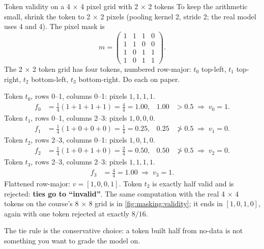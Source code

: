 \begin{worked}[label={we:masking:validity}]{Token validity on a 4 \texorpdfstring{$\times$}{x} 4 pixel grid with 2 \texorpdfstring{$\times$}{x} 2 tokens}
To keep the arithmetic small, shrink the token to 2 $\times$ 2 pixels (pooling kernel 2, stride 2; the
real model uses 4 and 4). The pixel mask is
\[
m = \begin{pmatrix} 1 & 1 & 1 & 0\\ 1 & 1 & 0 & 0\\ 1 & 0 & 1 & 1\\ 1 & 0 & 1 & 1 \end{pmatrix}.
\]
The 2 $\times$ 2 token grid has four tokens, numbered row-major: $t_0$ top-left, $t_1$ top-right,
$t_2$ bottom-left, $t_3$ bottom-right. Do each on paper.

Token $t_0$, rows 0--1, columns 0--1: pixels $1, 1, 1, 1$.
\begin{align*}
f_0 &= \tfrac14 (1 + 1 + 1 + 1) = \tfrac44 = 1.00, & 1.00 &> 0.5 \;\Rightarrow\; v_0 = 1 .
\end{align*}
Token $t_1$, rows 0--1, columns 2--3: pixels $1, 0, 0, 0$.
\begin{align*}
f_1 &= \tfrac14 (1 + 0 + 0 + 0) = \tfrac14 = 0.25, & 0.25 &\not> 0.5 \;\Rightarrow\; v_1 = 0 .
\end{align*}
Token $t_2$, rows 2--3, columns 0--1: pixels $1, 0, 1, 0$.
\begin{align*}
f_2 &= \tfrac14 (1 + 0 + 1 + 0) = \tfrac24 = 0.50, & 0.50 &\not> 0.5 \;\Rightarrow\; v_2 = 0 .
\end{align*}
Token $t_3$, rows 2--3, columns 2--3: pixels $1, 1, 1, 1$.
\begin{align*}
f_3 &= \tfrac44 = 1.00 \;\Rightarrow\; v_3 = 1 .
\end{align*}
Flattened row-major: $v = [1, 0, 0, 1]$. Token $t_2$ is exactly half valid and is rejected:
\textbf{ties go to ``invalid''}. The same computation with the real 4 $\times$ 4 tokens on the course's
8 $\times$ 8 grid is in \cref{fig:masking:validity}; it ends in $[1, 0, 1, 0]$, again with one token
rejected at exactly $8/16$.
\end{worked}

The tie rule is the conservative choice: a token built half from no-data is not something you want to
grade the model on.


